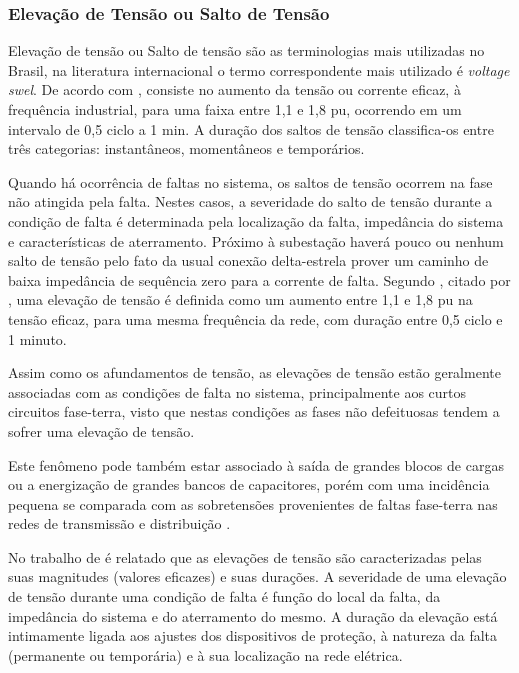 \subsubsection{Elevação de Tensão ou Salto de Tensão}
\par
Elevação de tensão ou Salto de tensão são as terminologias mais utilizadas no Brasil, na literatura internacional o termo correspondente mais utilizado é \textit{voltage swel}. De acordo com \cite{FER99}, consiste no aumento da tensão ou corrente eficaz, à frequência industrial, para uma faixa entre 1,1 e 1,8 pu, ocorrendo em um intervalo de 0,5 ciclo a 1 min. A duração dos saltos de tensão classifica-os entre três categorias: instantâneos, momentâneos e temporários.
\par
Quando há ocorrência de faltas no sistema, os saltos de tensão ocorrem na fase não atingida pela falta. Nestes casos, a severidade do salto de tensão durante a condição de falta é determinada pela localização da falta, impedância do sistema e características de aterramento. Próximo à subestação haverá pouco ou nenhum salto de tensão pelo fato da usual conexão delta-estrela prover um caminho de baixa impedância de sequência zero para a corrente de falta. Segundo \cite{OLIVE}, citado por \cite{DEL03}, uma elevação de tensão é definida como um aumento entre 1,1 e 1,8 pu na tensão eficaz, para uma mesma frequência da rede, com duração entre 0,5 ciclo e 1 minuto.
\par
Assim como os afundamentos de tensão, as elevações de tensão estão geralmente associadas com as condições de falta no sistema, principalmente aos curtos circuitos fase-terra, visto que nestas condições as fases não defeituosas tendem a sofrer uma elevação de tensão.
\par
Este fenômeno pode também estar associado à saída de grandes blocos de cargas ou a energização de grandes bancos de capacitores, porém com uma incidência pequena se comparada com as sobretensões provenientes de faltas fase-terra nas redes de transmissão e distribuição \citep{DUG96}.
\par
No trabalho de \cite{DEL03} é relatado que as elevações de tensão são caracterizadas pelas suas magnitudes (valores eficazes) e suas durações. A severidade de uma elevação de tensão durante uma condição de falta é função do local da falta, da impedância do sistema e do aterramento do mesmo. A duração da elevação está intimamente ligada aos ajustes dos dispositivos de proteção, à natureza da falta (permanente ou temporária) e à sua localização na rede elétrica.
\par
